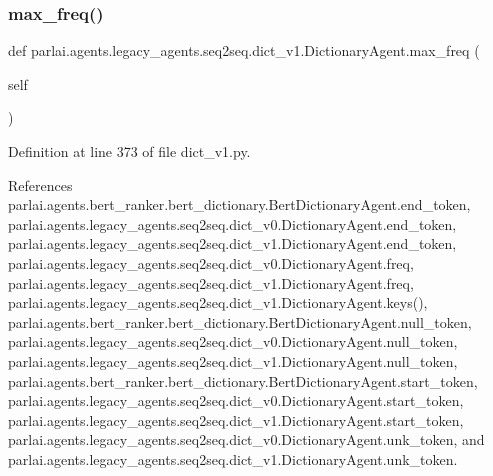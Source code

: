 \subsubsection{\texorpdfstring{max\+\_\+freq()}{max\_freq()}}
{\footnotesize\ttfamily def parlai.\+agents.\+legacy\+\_\+agents.\+seq2seq.\+dict\+\_\+v1.\+Dictionary\+Agent.\+max\+\_\+freq (\begin{DoxyParamCaption}\item[{}]{self }\end{DoxyParamCaption})}



Definition at line 373 of file dict\+\_\+v1.\+py.



References parlai.\+agents.\+bert\+\_\+ranker.\+bert\+\_\+dictionary.\+Bert\+Dictionary\+Agent.\+end\+\_\+token, parlai.\+agents.\+legacy\+\_\+agents.\+seq2seq.\+dict\+\_\+v0.\+Dictionary\+Agent.\+end\+\_\+token, parlai.\+agents.\+legacy\+\_\+agents.\+seq2seq.\+dict\+\_\+v1.\+Dictionary\+Agent.\+end\+\_\+token, parlai.\+agents.\+legacy\+\_\+agents.\+seq2seq.\+dict\+\_\+v0.\+Dictionary\+Agent.\+freq, parlai.\+agents.\+legacy\+\_\+agents.\+seq2seq.\+dict\+\_\+v1.\+Dictionary\+Agent.\+freq, parlai.\+agents.\+legacy\+\_\+agents.\+seq2seq.\+dict\+\_\+v1.\+Dictionary\+Agent.\+keys(), parlai.\+agents.\+bert\+\_\+ranker.\+bert\+\_\+dictionary.\+Bert\+Dictionary\+Agent.\+null\+\_\+token, parlai.\+agents.\+legacy\+\_\+agents.\+seq2seq.\+dict\+\_\+v0.\+Dictionary\+Agent.\+null\+\_\+token, parlai.\+agents.\+legacy\+\_\+agents.\+seq2seq.\+dict\+\_\+v1.\+Dictionary\+Agent.\+null\+\_\+token, parlai.\+agents.\+bert\+\_\+ranker.\+bert\+\_\+dictionary.\+Bert\+Dictionary\+Agent.\+start\+\_\+token, parlai.\+agents.\+legacy\+\_\+agents.\+seq2seq.\+dict\+\_\+v0.\+Dictionary\+Agent.\+start\+\_\+token, parlai.\+agents.\+legacy\+\_\+agents.\+seq2seq.\+dict\+\_\+v1.\+Dictionary\+Agent.\+start\+\_\+token, parlai.\+agents.\+legacy\+\_\+agents.\+seq2seq.\+dict\+\_\+v0.\+Dictionary\+Agent.\+unk\+\_\+token, and parlai.\+agents.\+legacy\+\_\+agents.\+seq2seq.\+dict\+\_\+v1.\+Dictionary\+Agent.\+unk\+\_\+token.

